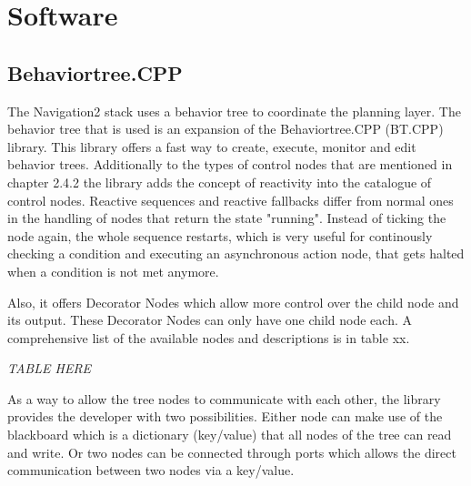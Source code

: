 \section{Software}

\subsection{Behaviortree.CPP}
The Navigation2 stack uses a behavior tree to coordinate the planning layer. The behavior tree that is used is an expansion of the Behaviortree.CPP (BT.CPP) library. This library offers a fast way to create, execute, monitor and edit behavior trees. 
Additionally to the types of control nodes that are mentioned in chapter 2.4.2 the library adds the concept of reactivity into the catalogue of control nodes. Reactive sequences and reactive fallbacks differ from normal ones in the handling of nodes that return the state "running". Instead of ticking the node again, the whole sequence restarts, which is very useful for continously checking a condition and executing an asynchronous action node, that gets halted when a condition is not met anymore. 

Also, it offers Decorator Nodes which allow more control over the child node and its output. These Decorator Nodes can only have one child node each. A comprehensive list of the available nodes and descriptions is in table xx.

\textit{TABLE HERE}

As a way to allow the tree nodes to communicate with each other, the library provides the developer with two possibilities. Either node can make use of the blackboard which is a dictionary (key/value) that all nodes of the tree can read and write. Or two nodes can be connected through ports which allows the direct communication between two nodes via a key/value.









 











